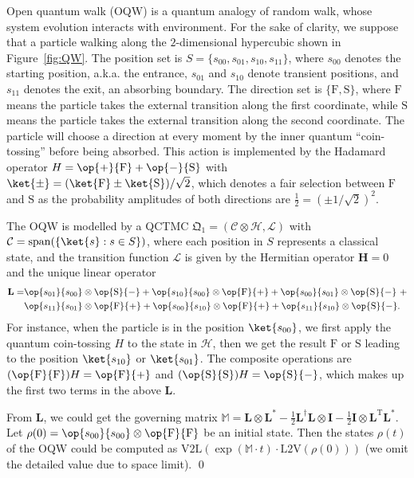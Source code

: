 \documentclass[a4paper,UKenglish,cleveref,autoref,thm-restate,authorcolumns]{lipics-v2019}
\newcommand{\QC}{\mathfrak{Q}}
\newcommand{\h}{\mathcal{H}}
\renewcommand{\L}{\mathcal{L}}
\newcommand{\M}{\mathds{M}}
\newcommand{\HH}{\mathbf{H}}
\newcommand{\LL}{\mathbf{L}}
\newcommand{\T}{\mathrm{T}}
\newcommand{\id}{\mathbf{I}}
\newcommand{\vl}{\mathrm{V2L}}
\newcommand{\lv}{\mathrm{L2V}}
\newcommand{\spn}{\mathrm{span}}
\begin{document}
\begin{example}\label{ex1}
	Open quantum walk (OQW) is a quantum analogy of random walk,
	whose system evolution interacts with environment.
	For the sake of clarity, we suppose that
	a particle walking along the $2$-dimensional hypercubic shown in Figure~\ref{fig:QW}.
	The position set is $S = \{s_{00}, s_{01}, s_{10}, s_{11}\}$,
	where $s_{00}$ denotes the starting position, a.k.a. the entrance,
	$s_{01}$ and $s_{10}$ denote transient positions,
	and $s_{11}$ denotes the exit, an absorbing boundary.
	The direction set is $\{\mathrm{F},\mathrm{S}\}$,
	where $\mathrm{F}$ means the particle takes the external transition along the first coordinate,
	while $\mathrm{S}$ means the particle takes the external transition along the second coordinate.
	The particle will choose a direction at every moment by the inner quantum ``coin-tossing''
	before being absorbed.
	This action is implemented by the Hadamard operator
	$H = \op{+}{\mathrm{F}} + \op{-}{\mathrm{S}}$
	with $\ket{\pm} = (\ket{\mathrm{F}}\pm\ket{\mathrm{S}})/\sqrt{2}$,
	which denotes a fair selection between $\mathrm{F}$ and $\mathrm{S}$
	as the probability amplitudes of both directions are $\tfrac{1}{2}=(\pm1/\sqrt{2})^2$.
	
	The OQW is modelled by a QCTMC $\QC_1=(\mathcal{C}\otimes\h,\L)$
	with $\mathcal{C}=\spn(\{\ket{s}:s\in S\})$,
	where each position in $S$ represents a classical state,
	and the transition function $\L$ is given by the Hermitian operator $\HH=0$
	and the unique linear operator
	\[
	\begin{aligned}
		\LL = & \op{s_{01}}{s_{00}}\otimes\op{\mathrm{S}}{-}
			+ \op{s_{10}}{s_{00}}\otimes\op{\mathrm{F}}{+}
			+ \op{s_{00}}{s_{01}}\otimes\op{\mathrm{S}}{-} \ + \\
			& \op{s_{11}}{s_{01}}\otimes\op{\mathrm{F}}{+}
			+ \op{s_{00}}{s_{10}}\otimes\op{\mathrm{F}}{+} 
			+ \op{s_{11}}{s_{10}}\otimes\op{\mathrm{S}}{-}.
	\end{aligned}
	\]
	For instance, when the particle is in the position $\ket{s_{00}}$,
	we first apply the quantum coin-tossing $H$ to the state in $\h$,
	then we get the result $\mathrm{F}$ or $\mathrm{S}$
	leading to the position $\ket{s_{10}}$ or $\ket{s_{01}}$.
	The composite operations are $(\op{\mathrm{F}}{\mathrm{F}}) H = \op{\mathrm{F}}{+}$
	and $(\op{\mathrm{S}}{\mathrm{S}}) H = \op{\mathrm{S}}{-}$,
	which makes up the first two terms in the above $\LL$.
	
	From $\LL$,
	we could get the governing matrix
	$\M = \LL\otimes\LL^* - \tfrac{1}{2}\LL^\dag\LL\otimes\id - \tfrac{1}{2}\id\otimes\LL^\T\LL^*$.
	Let $\rho(0) = \op{s_{00}}{s_{00}}\otimes\op{\mathrm{F}}{\mathrm{F}}$ be an initial state.
	Then the states $\rho(t)$ of the OQW could be computed
	as $\vl(\exp(\M\cdot t)\cdot\lv(\rho(0)))$ (we omit the detailed value due to space limit). \qed
		

\end{example}
\end{document}
